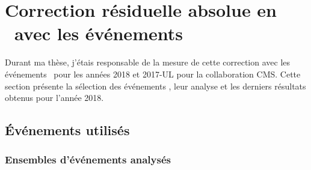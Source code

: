 \section{Correction résiduelle absolue en \pT\ avec les événements \Gjets}\label{chapter-JERC-section-JES}
Durant ma thèse, j'étais responsable de la mesure de cette correction avec les événements \Gjets\ pour les années 2018 et 2017-UL pour la collaboration CMS.
Cette section présente la sélection des événements \Gjets, leur analyse et les derniers résultats obtenus pour l'année 2018.
\subsection{Événements utilisés}\label{chapter-JERC-section-JES-subsec-evt_select}
\subsubsection{Ensembles d'événements analysés}
%     
%     
%     
%
%
%     
%     
%     
%     
%
%
%     
%     
%     
%     
